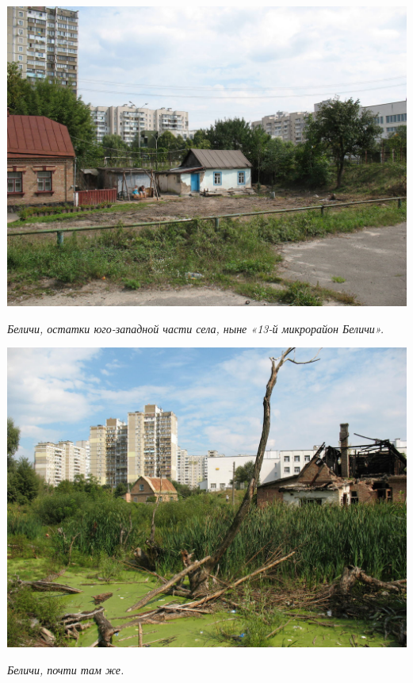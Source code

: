 \begin{center}
\includegraphics[width=0.95\linewidth]{rpix/IMG_3949.JPG}

\textit{Беличи, остатки юго-западной части села, ныне «13-й микрорайон Беличи».}
\end{center}


\begin{center}
\includegraphics[width=\linewidth]{rpix/IMG_3964.JPG}

\textit{Беличи, почти там же.}
\end{center}


\newpage


